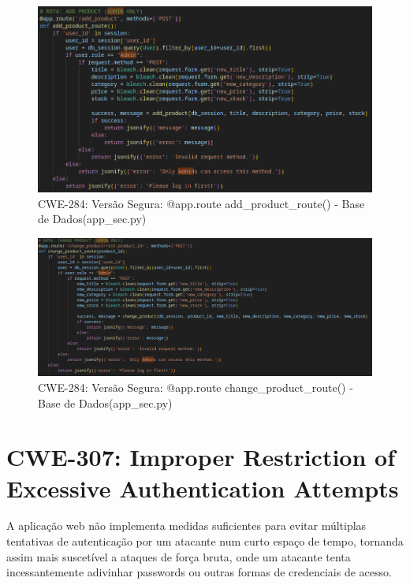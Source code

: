 \begin{figure}[H]
  \centering
  \includegraphics[width=16cm]{images/CWE-284-product_route-secure.png}
  \caption{CWE-284: Versão Segura: @app.route add\_product\_route() - Base de Dados(app\_sec.py)}
  \label{fig:cwe284-add-product-route-secure}
\end{figure}

\begin{figure}[H]
  \centering
  \includegraphics[width=16cm]{images/CWE-284-change_product_route-secure.png}
  \caption{CWE-284: Versão Segura: @app.route change\_product\_route() - Base de Dados(app\_sec.py)}
  \label{fig:cwe284-change-product-route-secure}
\end{figure}

%
%
\section{CWE-307: Improper Restriction of Excessive Authentication Attempts}
\label{sec.cwe307}
A aplicação web não implementa medidas suficientes para evitar múltiplas tentativas de autenticação por um atacante num curto espaço de tempo, tornanda assim mais suscetível a ataques de força bruta, onde um atacante tenta incessantemente adivinhar passwords ou outras formas de credenciais de acesso.


